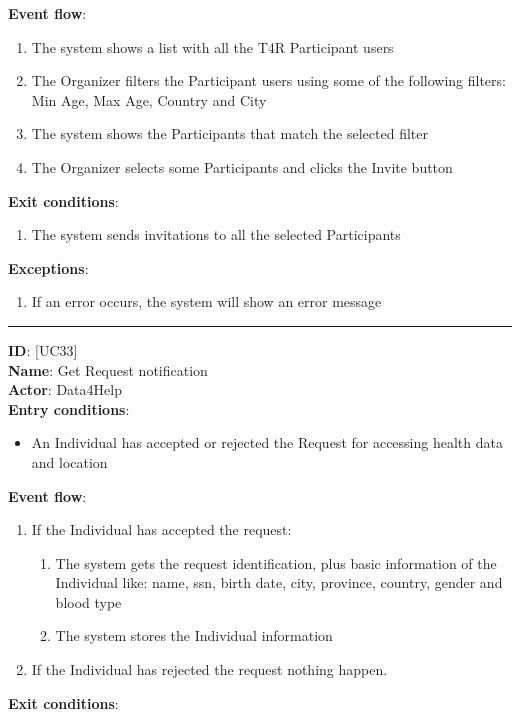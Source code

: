 \documentclass[a4paper, hidelinks, 12pt]{report}
\newcommand\usecase[1]{ [UC#1] }
\begin{document}
\begin{itemize}
\begin{enumerate}
		\end{enumerate}
		\textbf{Event flow}:
		\begin{enumerate}
			\item{The system shows a list with all the T4R Participant users}
			\item{The Organizer filters the Participant users using some of the following filters: Min Age, Max Age, Country and City}
			\item{The system shows the Participants that match the selected filter}
			\item{The Organizer selects some Participants and clicks the Invite button}
		\end{enumerate}
		\textbf{Exit conditions}:
		\begin{enumerate}
			\item{The system sends invitations to all the selected Participants}
		\end{enumerate}
		\textbf{Exceptions}:
		\begin{enumerate}
			\item{If an error occurs, the system will show an error message}
		\end{enumerate}
		\rule{\linewidth}{0.4pt}
		\textbf{ID}: \usecase{33} \\
		\textbf{Name}: Get Request notification \\
		\textbf{Actor}: Data4Help \\
		\textbf{Entry conditions}:
		\begin{itemize}
			\item{An Individual has accepted or rejected the Request for accessing health data and location}
		\end{itemize}
		\textbf{Event flow}:
		\begin{enumerate}
			\item{If the Individual has accepted the request}:
			\begin{enumerate}
				\item{The system gets the request identification, plus basic information of the Individual like: name, ssn, birth date, city, province, country, gender and blood type}
				\item{The system stores the Individual information}			
			\end{enumerate}
			\item{If the Individual has rejected the request nothing happen.}
		\end{enumerate}
		\textbf{Exit conditions}:
		\begin{itemize}

\end{itemize}
\end{itemize}
\end{document}
